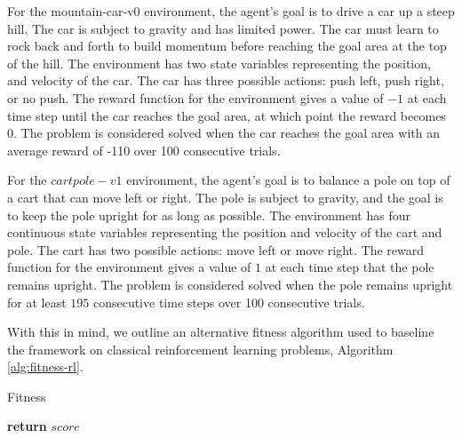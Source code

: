 \documentclass[12pt, final]{dalcsthesis}
\begin{document}
For the mountain-car-v0 environment, the agent's goal is to drive a car up a steep hill. The car is subject to gravity and has limited power. The car must learn to rock back and forth to build momentum before reaching the goal area at the top of the hill. The environment has two state variables representing the position, and velocity of the car. The car has three possible actions: push left, push right, or no push. The reward function for the environment gives a value of $-1$ at each time step until the car reaches the goal area, at which point the reward becomes $0$. The problem is considered solved when the car reaches the goal area with an average reward of -110 over 100 consecutive trials.

For the $cartpole-v1$ environment, the agent's goal is to balance a pole on top of a cart that can move left or right. The pole is subject to gravity, and the goal is to keep the pole upright for as long as possible. The environment has four continuous state variables representing the position and velocity of the cart and pole. The cart has two possible actions: move left or move right. The reward function for the environment gives a value of $1$ at each time step that the pole remains upright. The problem is considered solved when the pole remains upright for at least $195$ consecutive time steps over 100 consecutive trials.

With this in mind, we outline an alternative fitness algorithm used to baseline the framework on classical reinforcement learning problems, Algorithm \ref{alg:fitness-rl}.

\begin{algorithm}[hb]
	\caption{Fitness}
	\label{alg:fitness-rl}
	\begin{algorithmic}[1]
		\EndWhile
		\EndFor
		\State \textbf{return} $score$
		\EndProcedure
	\end{algorithmic}
\end{algorithm}
\end{document}
